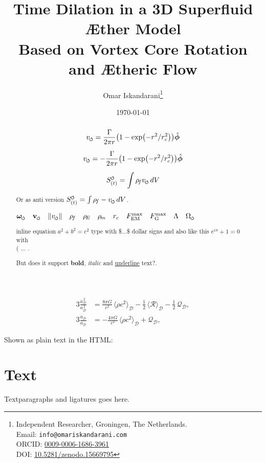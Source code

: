 \documentclass{article}
\title{Time Dilation in a 3D Superfluid Æther Model\\  Based on Vortex Core Rotation and Ætheric Flow }
\author{
    Omar Iskandarani\thanks{
        Independent Researcher, Groningen, The Netherlands.\\
        Email: \texttt{info@omariskandarani.com}\\
        ORCID: \href{https://orcid.org/0009-0006-1686-3961}{0009-0006-1686-3961}\\
        DOI: \href{https://doi.org/10.5281/zenodo.15669902}{10.5281/zenodo.15669795}
    }
}
\date{\today}
\newcommand{\vswirl}{v_{\mkern-2mu\scriptscriptstyle\boldsymbol{\circlearrowleft}}}
\newcommand{\vswirlcw}{-\vswirl}
\newcommand{\omegas}{\boldsymbol{\omega}_{\mkern-2mu\scriptscriptstyle\boldsymbol{\circlearrowleft}}}  %
\newcommand{\vscore}{\mathbf{v}_{\mkern-2mu\scriptscriptstyle\boldsymbol{\circlearrowleft}}}                    %
\newcommand{\vnorm}{\lVert \vswirl \rVert}               %
\newcommand{\rhof}{\rho_{\!f}}                           %
\newcommand{\rhoE}{\rho_{\!E}}                           %
\newcommand{\rhom}{\rho_{\!m}}                           %
\newcommand{\rc}{r_c}                                    %
\newcommand{\FmaxEM}{F_{\mathrm{EM}}^{\max}}             %
\newcommand{\FmaxG}{F_{\mathrm{G}}^{\max}}               %
\newcommand{\Lam}{\Lambda}                               %
\newcommand{\Om}{\Omega_{\mkern-2mu\scriptscriptstyle\boldsymbol{\circlearrowleft}}}                   %
\begin{document}
    \maketitle

    \begin{abstract}

        \begin{equation}
            \vswirl = \frac{\Gamma}{2\pi r}\bigl(1-\exp(-r^2/\rc^2)\bigr)\hat{\bm{\phi}}
        \end{equation}

        \[ \vswirl = -\frac{\Gamma}{2\pi r}\bigl(1-\exp(-r^2/\rc^2)\bigr)\hat{\bm{\phi}}\]


        \begin{equation}
            S_{(t)}^{\mkern-2mu\scriptscriptstyle\boldsymbol{\circlearrowleft}} = \int \rhof \vswirl \, dV
        \end{equation}

        Or as anti version \(S_{(t)}^{\mkern-2mu\scriptscriptstyle\boldsymbol{\circlearrowleft}} = \int \rhof \vswirlcw \, dV\).

        $\omegas\quad \vscore\quad \vnorm\quad \rhof\quad \rhoE\quad \rhom\quad \rc\quad \FmaxEM\quad \FmaxG\quad \Lam\quad \Om$

        inline equation $a^2 + b^2 = c^2$ type with \$...\$ dollar signs
        and also like this \(e^{i\pi} + 1 = 0\) with \\( ... \).

        But does it support \textbf{bold}, \textit{italic} and \underline{underline} text?.

    \end{abstract}

    \begin{align}
        3\frac{\dot a_\mathcal{D}^{\,2}}{a_\mathcal{D}^{\,2}}
        &= \frac{8\pi G}{c^2}\,\langle \rho c^2 \rangle_\mathcal{D}
        - \tfrac{1}{2}\,\langle \mathcal{R} \rangle_\mathcal{D}
        - \tfrac{1}{2}\,\mathcal{Q}_\mathcal{D}, \tag{F1}\label{F1}\\
        3\frac{\ddot a_\mathcal{D}}{a_\mathcal{D}}
        &= -\frac{4\pi G}{c^2}\,\langle \rho c^2 \rangle_\mathcal{D}
        + \mathcal{Q}_\mathcal{D}, \tag{F2}\label{F2}
    \end{align}


    Shown as plain text in the HTML:

    \section{Text}
    Text\quad paragraphs and ligatures goes here.
\end{document}
